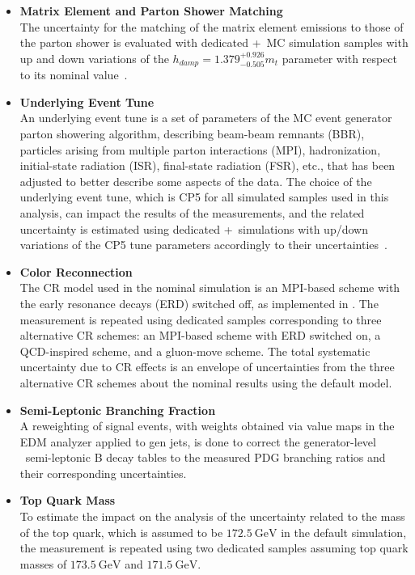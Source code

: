 \begin{itemize}
    \item {\bf Matrix Element and Parton Shower Matching} \\
    The uncertainty for the matching of the matrix element emissions to those of the parton shower is evaluated with dedicated \Powheg+\Pythia\ MC simulation samples with up and down variations of the $h_{damp} = 1.379^{+0.926}_{-0.505}m_t$ parameter with respect to its nominal value~\cite{Sirunyan:2669320}.
    \item {\bf Underlying Event Tune} \\
    An underlying event tune is a set of parameters of the MC event generator parton showering algorithm, describing beam-beam remnants (BBR), particles arising from multiple parton interactions (MPI), hadronization, initial-state radiation (ISR), final-state radiation (FSR), etc., that has been adjusted to better describe some aspects of the data.
    The choice of the underlying event tune, which is CP5 for all simulated samples used in this analysis, can impact the results of the measurements, and the related uncertainty is estimated using dedicated \Powheg+\Pythia\ simulations with up/down variations of the CP5 tune parameters accordingly to their uncertainties~\cite{Sirunyan:2669320}.
    \item {\bf Color Reconnection} \\
    The CR model used in the nominal \ttbar simulation is an MPI-based scheme with the early resonance decays (ERD) switched off, as implemented in \Pythia. 
    The measurement is repeated using dedicated \ttbar samples corresponding to three alternative CR schemes: an MPI-based scheme with ERD switched on, a QCD-inspired scheme, and a gluon-move scheme. 
    The total systematic uncertainty due to CR effects is an envelope of uncertainties from the three alternative CR schemes about the nominal results using the default model.
    \item {\bf Semi-Leptonic Branching Fraction} \\
    A reweighting of \ttbar signal events, with weights obtained via value maps in the EDM analyzer applied to gen jets, is done to correct the generator-level \Pythia\ semi-leptonic B decay tables to the measured PDG branching ratios and their corresponding uncertainties.
    \item {\bf Top Quark Mass} \\
    To estimate the impact on the analysis of the uncertainty related to the mass of the top quark, which is assumed to be $\SI{172.5}{\GeV}$ in the default simulation, the measurement is repeated using two dedicated samples assuming top quark masses of $\SI{173.5}{\GeV}$ and $\SI{171.5}{\GeV}$.

\end{itemize}
